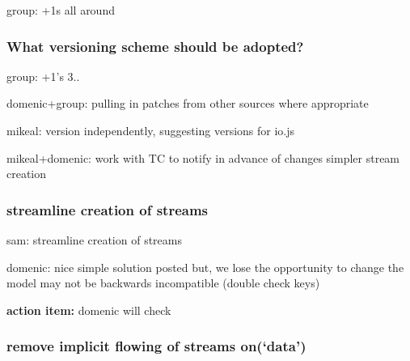 \begin{DoxyItemize}
\item group\+: +1\textquotesingle{}s all around
\end{DoxyItemize}

\subsubsection*{What versioning scheme should be adopted?}


\begin{DoxyItemize}
\item group\+: +1’s 3..
\item domenic+group\+: pulling in patches from other sources where appropriate
\item mikeal\+: version independently, suggesting versions for io.\+js
\item mikeal+domenic\+: work with TC to notify in advance of changes simpler stream creation
\end{DoxyItemize}

\subsubsection*{streamline creation of streams}


\begin{DoxyItemize}
\item sam\+: streamline creation of streams
\item domenic\+: nice simple solution posted but, we lose the opportunity to change the model may not be backwards incompatible (double check keys)

{\bfseries action item\+:} domenic will check
\end{DoxyItemize}

\subsubsection*{remove implicit flowing of streams on(‘data’)}


